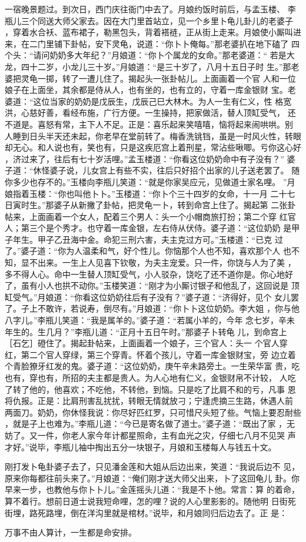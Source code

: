 一宿晚景题过。到次日，西门庆往衙门中去了。月娘约饭时前后，与孟玉楼、
李瓶儿三个同送大师父家去。因在大门里首站立，见一个乡里卜龟儿卦儿的老婆子
，穿着水合袄、蓝布裙子，勒黑包头，背着褡裢，正从街上走来。月娘使小厮叫进
来，在二门里铺下卦帖，安下灵龟，说道：“你卜卜俺每。”那老婆扒在地下磕了
四个头：“请问奶奶多大年纪？”月娘道：“你卜个属龙的女命。”那老婆道：“
若是大龙，四十二岁，小龙儿三十岁。”月娘道：“是三十岁了，八月十五日子时
生。”那老婆把灵龟一掷，转了一遭儿住了。揭起头一张卦帖儿。上面画着一个官
人和一位娘子在上面坐，其余都是侍从人，也有坐的，也有立的，守着一库金银财
宝。老婆道：“这位当家的奶奶是戊辰生，戊辰己巳大林木。为人一生有仁义，性
格宽洪，心慈好善，看经布施，广行方便。一生操持，把家做活，替人顶缸受气，
还不道是。喜怒有常，主下人不足。正是：喜乐起来笑嘻嘻，恼将起来闹哄哄。别
人睡到日头半天还未起，你老早在堂前转了。梅香洗铫铛，虽是一时风火性，转眼
却无心。和人说也有，笑也有，只是这疾厄宫上着刑星，常沾些啾唧。亏你这心好
，济过来了，往后有七十岁活哩。”孟玉楼道：“你看这位奶奶命中有子没有？”
婆子道：“休怪婆子说，儿女宫上有些不实，往后只好招个出家的儿子送老罢了。
随你多少也存不的。”玉楼向李瓶儿笑道：“就是你家吴应元，见做道士家名哩。
”月娘指着玉楼：“你也叫他卜卜。”玉楼道：“你卜个三十四岁的女命，十一月
二十七日寅时生。”那婆子从新撇了卦帖，把灵龟一卜，转到命宫上住了。揭起第
二张卦帖来，上面画着一个女人，配着三个男人：头一个小帽商旅打扮；第二个穿
红官人；第三个是个秀才。也守着一库金银，左右侍从伏侍。婆子道：“这位奶奶
是甲子年生。甲子乙丑海中金。命犯三刑六害，夫主克过方可。”玉楼道：“已克
过了。”婆子道：“你为人温柔和气，好个性儿。你恼那个人也不知，喜欢那个人
也不知，显不出来。一生上人见喜下钦敬，为夫主宠爱。只一件，你饶与人为了美
，多不得人心。命中一生替人顶缸受气，小人驳杂，饶吃了还不道你是。你心地好
了，虽有小人也拱不动你。”玉楼笑道：“刚才为小厮讨银子和他乱了，这回说是
顶缸受气。”月娘道：“你看这位奶奶往后有子没有？”婆子道：“济得好，见个
女儿罢了。子上不敢许，若说寿，倒尽有。”月娘道：“你卜卜这位奶奶。李大姐
，你与他八字儿。”李瓶儿笑道：“我是属羊的。”婆子道：“若属小羊的，今年
念七岁，辛未年生的。生几月？”李瓶儿道：“正月十五日午时。”那婆子卜转龟
儿，到命宫上［石乞］磴住了。揭起卦帖来，上面画着一个娘子，三个官人：头一
个官人穿红，第二个官人穿绿，第三个穿青。怀着个孩儿，守着一库金银财宝，旁
边立着个青脸獠牙红发的鬼。婆子道：“这位奶奶，庚午辛未路旁土。一生荣华富
贵，吃也有，穿也有，所招的夫主都是贵人。为人心地有仁义，金银财帛不计较，
人吃了转了他的，他喜欢；不吃他，不转他，到恼。只是吃了比肩不和的亏，凡事
恩将仇报。正是：比肩刑害乱扰扰，转眼无情就放刁；宁逢虎摘三生路，休遇人前
两面刀。奶奶，你休怪我说：你尽好匹红罗，只可惜尺头短了些。气恼上要忍耐些
，就是子上也难为。”李瓶儿道：“今已是寄名做了道士。”婆子道：“既出了家
，无妨了。又一件，你老人家今年计都星照命，主有血光之灾，仔细七八月不见哭
声才好。”说毕，李瓶儿袖中掏出五分一块银子，月娘和玉楼每人与钱五十文。

刚打发卜龟卦婆子去了，只见潘金莲和大姐从后边出来，笑道：“我说后边不
见，原来你每都往前头来了。”月娘道：“俺们刚才送大师父出来，卜了这回龟儿
卦。你早来一步，也教他与你卜卜儿。”金莲摇头儿道：“我是不卜他。常言：算
的着命，算不着行。想前日道士说我短命哩，怎的哩？说的人心里影影的。随他明
日街死街埋，路死路埋，倒在洋沟里就是棺材。”说毕，和月娘同归后边去了。正
是：

万事不由人算计，一生都是命安排。